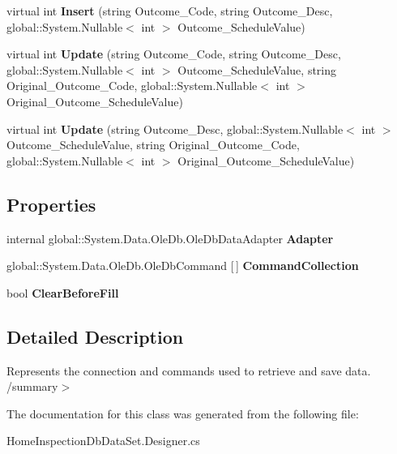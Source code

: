 \begin{DoxyCompactItemize}
virtual int {\bfseries Insert} (string Outcome\+\_\+\+Code, string Outcome\+\_\+\+Desc, global\+::\+System.\+Nullable$<$ int $>$ Outcome\+\_\+\+Schedule\+Value)
\item 
\mbox{\label{class_a_f_h___scheduler_1_1_home_inspection_db_data_set_table_adapters_1_1_inspection___outcomes_table_adapter_addaa24483c963e90639e2a9edff3f3cd}} 
virtual int {\bfseries Update} (string Outcome\+\_\+\+Code, string Outcome\+\_\+\+Desc, global\+::\+System.\+Nullable$<$ int $>$ Outcome\+\_\+\+Schedule\+Value, string Original\+\_\+\+Outcome\+\_\+\+Code, global\+::\+System.\+Nullable$<$ int $>$ Original\+\_\+\+Outcome\+\_\+\+Schedule\+Value)
\item 
\mbox{\label{class_a_f_h___scheduler_1_1_home_inspection_db_data_set_table_adapters_1_1_inspection___outcomes_table_adapter_ae55ae1203c83d94c30aebff0b5272111}} 
virtual int {\bfseries Update} (string Outcome\+\_\+\+Desc, global\+::\+System.\+Nullable$<$ int $>$ Outcome\+\_\+\+Schedule\+Value, string Original\+\_\+\+Outcome\+\_\+\+Code, global\+::\+System.\+Nullable$<$ int $>$ Original\+\_\+\+Outcome\+\_\+\+Schedule\+Value)
\end{DoxyCompactItemize}
\subsection*{Properties}
\begin{DoxyCompactItemize}
\item 
\mbox{\label{class_a_f_h___scheduler_1_1_home_inspection_db_data_set_table_adapters_1_1_inspection___outcomes_table_adapter_a995043f802ff27bb83e6bf5fa8b83c49}} 
internal global\+::\+System.\+Data.\+Ole\+Db.\+Ole\+Db\+Data\+Adapter {\bfseries Adapter}\hspace{0.3cm}{\ttfamily  [get]}
\item 
\mbox{\label{class_a_f_h___scheduler_1_1_home_inspection_db_data_set_table_adapters_1_1_inspection___outcomes_table_adapter_adbfe26929e9e6d9c7c768b51273dd149}} 
global\+::\+System.\+Data.\+Ole\+Db.\+Ole\+Db\+Command [$\,$] {\bfseries Command\+Collection}\hspace{0.3cm}{\ttfamily  [get]}
\item 
\mbox{\label{class_a_f_h___scheduler_1_1_home_inspection_db_data_set_table_adapters_1_1_inspection___outcomes_table_adapter_a407687eac6819a2805fb52e9d1af0f63}} 
bool {\bfseries Clear\+Before\+Fill}\hspace{0.3cm}{\ttfamily  [get, set]}
\end{DoxyCompactItemize}


\subsection{Detailed Description}
Represents the connection and commands used to retrieve and save data. /summary$>$ 

The documentation for this class was generated from the following file\+:\begin{DoxyCompactItemize}
\item 
Home\+Inspection\+Db\+Data\+Set.\+Designer.\+cs\end{DoxyCompactItemize}
